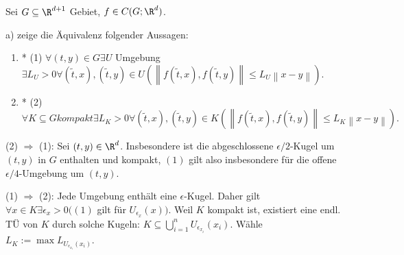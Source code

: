 \begin{exercise}

Sei $G \subseteq \R^{d+1}$ Gebiet, $f \in C(G; \R^d)$.

a) zeige die Äquivalenz folgender Aussagen:

\begin{enumerate}
  \item* (1) $\forall (t, y) \in G \exists U$ Umgebung $\exists L_U > 0 \forall (\tilde{t}, x), (\tilde{t}, y) \in U
  (\left\lVert f(\tilde{t}, x), f(\tilde{t}, y) \right\rVert \leq L_U \left\lVert x-y \right\rVert).$
  \item* (2) $\forall K \subseteq G kompakt \exists L_K > 0 \forall (\tilde{t}, x), (\tilde{t}, y) \in K
  (\left\lVert f(\tilde{t}, x), f(\tilde{t}, y) \right\rVert \leq L_K \left\lVert x-y \right\rVert).$
\end{enumerate}

\end{exercise}

\begin{solution}

(2) $\Rightarrow$ (1):
Sei $(t, y) \in \R^d$.
Insbesondere ist die abgeschlossene $\epsilon /2$-Kugel um $(t,y)$ in $G$ enthalten und kompakt, $(1)$ gilt also insbesondere für die offene $\epsilon /4$-Umgebung um $(t,y)$.

(1) $\Rightarrow$ (2):
Jede Umgebung enthält eine $\epsilon$-Kugel.
Daher gilt $\forall x \in K \exists \epsilon_x > 0 ( (1)$ gilt für $U_{\epsilon_x}(x))$.
Weil $K$ kompakt ist, existiert eine endl. TÜ von $K$ durch solche Kugeln:
$K \subseteq \bigcup_{i = 1}^n U_{\epsilon_{x_i}}(x_i)$.
Wähle $L_K := \max L_{U_{\epsilon_{x_i}}(x_i)}$.

\end{solution}
